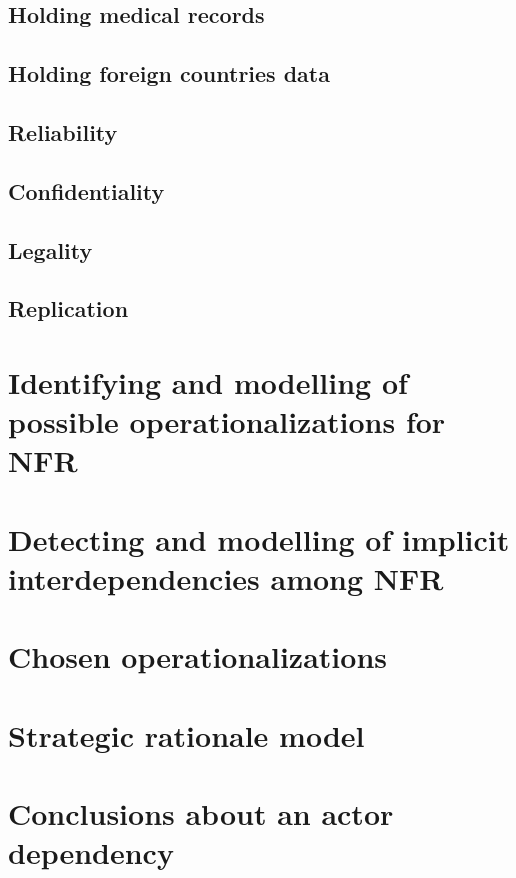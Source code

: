 \documentclass{VUMIFPSkursinis}
\begin{document}
	\subsection{Holding medical records}
	\subsection{Holding foreign countries data}
	\subsection{Reliability}
	\subsection{Confidentiality}
	\subsection{Legality}
	\subsection{Replication}

\section{Identifying and modelling of possible operationalizations for NFR}

\section{Detecting and modelling of implicit interdependencies among NFR}

\section{Chosen operationalizations}

\section{Strategic rationale model}

\section{Conclusions about an actor dependency}

\end{document}
